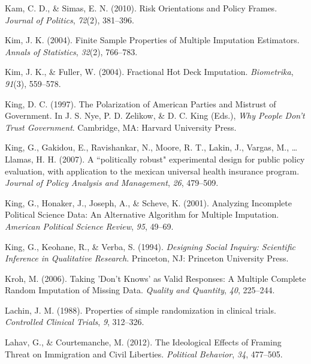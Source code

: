 \documentclass[12pt,econ]{sources/authesis}
\begin{document}
\leavevmode\hypertarget{ref-kam_risk_2010}{}%
Kam, C. D., \& Simas, E. N. (2010). Risk Orientations and Policy Frames. \emph{Journal of Politics}, \emph{72}(2), 381--396.

\leavevmode\hypertarget{ref-kim_2004_finite}{}%
Kim, J. K. (2004). Finite Sample Properties of Multiple Imputation Estimators. \emph{Annals of Statistics}, \emph{32}(2), 766--783.

\leavevmode\hypertarget{ref-kim_2004_fractional}{}%
Kim, J. K., \& Fuller, W. (2004). Fractional Hot Deck Imputation. \emph{Biometrika}, \emph{91}(3), 559--578.

\leavevmode\hypertarget{ref-king_polarization_1997}{}%
King, D. C. (1997). The Polarization of American Parties and Mistrust of Government. In J. S. Nye, P. D. Zelikow, \& D. C. King (Eds.), \emph{Why People Don't Trust Government}. Cambridge, MA: Harvard University Press.

\leavevmode\hypertarget{ref-king_a-politically_2007}{}%
King, G., Gakidou, E., Ravishankar, N., Moore, R. T., Lakin, J., Vargas, M., \ldots{} Llamas, H. H. (2007). A ``politically robust" experimental design for public policy evaluation, with application to the mexican universal health insurance program. \emph{Journal of Policy Analysis and Management}, \emph{26}, 479--509.

\leavevmode\hypertarget{ref-king_2001_analyzing}{}%
King, G., Honaker, J., Joseph, A., \& Scheve, K. (2001). Analyzing Incomplete Political Science Data: An Alternative Algorithm for Multiple Imputation. \emph{American Political Science Review}, \emph{95}, 49--69.

\leavevmode\hypertarget{ref-king_designing_1994}{}%
King, G., Keohane, R., \& Verba, S. (1994). \emph{Designing Social Inquiry: Scientific Inference in Qualitative Research}. Princeton, NJ: Princeton University Press.

\leavevmode\hypertarget{ref-kroh_2006_taking}{}%
Kroh, M. (2006). Taking 'Don't Knows' as Valid Responses: A Multiple Complete Random Imputation of Missing Data. \emph{Quality and Quantity}, \emph{40}, 225--244.

\leavevmode\hypertarget{ref-lachin_1988_properties}{}%
Lachin, J. M. (1988). Properties of simple randomization in clinical trials. \emph{Controlled Clinical Trials}, \emph{9}, 312--326.

\leavevmode\hypertarget{ref-lahav_ideological_2012}{}%
Lahav, G., \& Courtemanche, M. (2012). The Ideological Effects of Framing Threat on Immigration and Civil Liberties. \emph{Political Behavior}, \emph{34}, 477--505.
\end{document}
